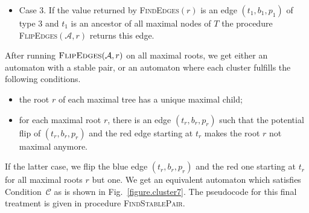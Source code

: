 \documentclass[11pt,a4paper]{article}
\def\A{\mathcal{A}}
\def\C{\mathscr{C}}
\def\T{{T}}
\begin{document}
\begin{itemize}
\begin{figure}[htbp]
{\begin{VCPicture}{(0,-1)(12,12)}
{
}
\end{VCPicture}}
        \caption{The
          picture on the left illustrates Case 2.2.3.2 of the main treatment.
          The edge $(t_1,b_1,p_1)$ has type 2.  After flipping the edge
          $(t_1,b_1,p_1)$ and the red edge going out of $t_1$, we get the
          automaton on the right part of the figure. The root $r$ has a new single child
          $s_1$ ancestor of a maximal state, whose set of outgoing
          edges is a bunch. The new tree rooted at $r$ has here the
          same level $\ell =2$ as before and \textsc{FlipEdges}$(\A,r)$ is
          called a second and last time.}
\label{figure.cluster6}
\end{figure}
\item Case 3. If the value returned by \textsc{FindEdges}$(r)$ is an
  edge $(t_1,b_1,p_1)$ of type 3 and $t_1$ is an ancestor of all maximal
  nodes of $\T$ the procedure \textsc{FlipEdges}$(\A,r)$ returns this
  edge.
\end{itemize}

After running $\textsc{FlipEdges}(\A,r)$ on all maximal roots, we
get either an automaton with a stable pair, or an automaton where each
cluster fulfills the following conditions.
\begin{itemize}
\item the root $r$ of each maximal tree has a unique maximal child;
\item for each maximal root $r$, there is an edge $(t_r,b_r,p_r)$ such
  that the potential flip of $(t_r,b_r,p_r)$ and the red edge starting at 
  $t_r$ makes the root $r$ not maximal anymore.
\end{itemize}
If the latter case, we flip the blue edge $(t_r,b_r,p_r)$ and the red
one starting at $t_r$ for all maximal roots $r$ but one. We get an
equivalent automaton which satisfies Condition~$\C$ as is shown in
Fig.~\ref{figure.cluster7}. The pseudocode for this final treatment
is given in procedure \textsc{FindStablePair}.
\end{document}
